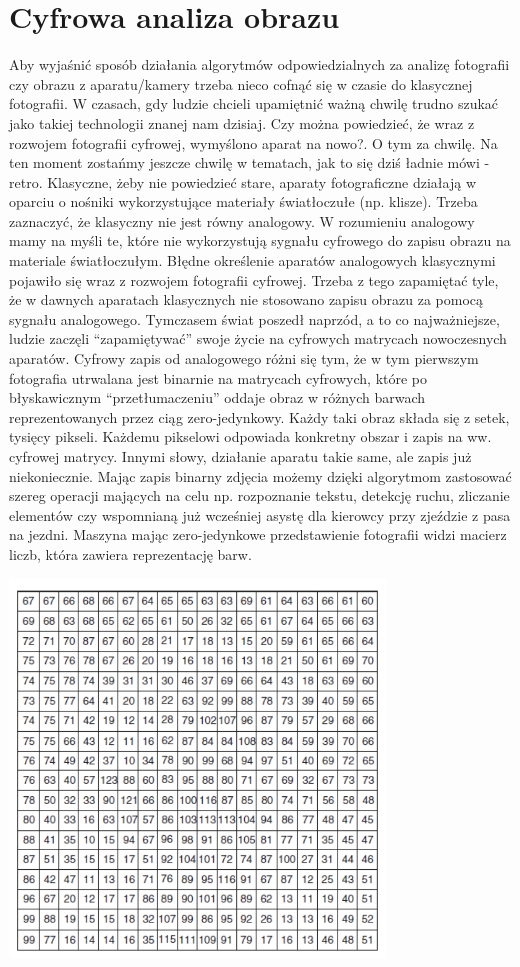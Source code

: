 \documentclass{article}
\begin{document}
\section*{\textbf{Cyfrowa analiza obrazu}}
Aby wyjaśnić sposób działania algorytmów odpowiedzialnych za analizę fotografii czy obrazu z aparatu/kamery trzeba nieco cofnąć się w czasie do klasycznej fotografii.
W czasach, gdy ludzie chcieli upamiętnić ważną chwilę trudno szukać jako takiej technologii znanej nam dzisiaj. Czy można powiedzieć, że wraz z rozwojem fotografii cyfrowej, wymyślono aparat na nowo?. O tym za chwilę. Na ten moment zostańmy jeszcze chwilę w tematach, jak to się dziś ładnie mówi - retro. Klasyczne, żeby nie powiedzieć stare, aparaty fotograficzne działają w oparciu o nośniki wykorzystujące materiały światłoczułe (np. klisze). Trzeba zaznaczyć, że klasyczny nie jest równy analogowy. W rozumieniu analogowy mamy na myśli te, które nie wykorzystują sygnału cyfrowego do zapisu obrazu na materiale światłoczułym. Błędne określenie aparatów analogowych klasycznymi pojawiło się wraz z rozwojem fotografii cyfrowej. Trzeba z tego zapamiętać tyle, że w dawnych aparatach klasycznych nie stosowano zapisu obrazu za pomocą sygnału analogowego. Tymczasem świat poszedł naprzód, a to co najważniejsze, ludzie zaczęli “zapamiętywać” swoje życie na cyfrowych matrycach nowoczesnych aparatów. Cyfrowy zapis od analogowego różni się tym, że w tym pierwszym fotografia utrwalana jest binarnie na matrycach cyfrowych, które po błyskawicznym “przetłumaczeniu” oddaje obraz w różnych barwach reprezentowanych przez ciąg zero-jedynkowy. Każdy taki obraz składa się z setek, tysięcy pikseli. Każdemu pikselowi odpowiada konkretny obszar i zapis na ww. cyfrowej matrycy. Innymi słowy, działanie aparatu takie same, ale zapis już niekoniecznie. Mając zapis binarny zdjęcia możemy dzięki algorytmom zastosować szereg operacji mających na celu np. rozpoznanie tekstu, detekcję ruchu, zliczanie elementów czy wspomnianą już wcześniej asystę dla kierowcy przy zjeździe z pasa na jezdni. Maszyna mając zero-jedynkowe przedstawienie fotografii widzi macierz liczb, która zawiera reprezentację barw.
\begin{center}
\includegraphics[width=10cm]{macierz}
\end{center}
\end{document}
